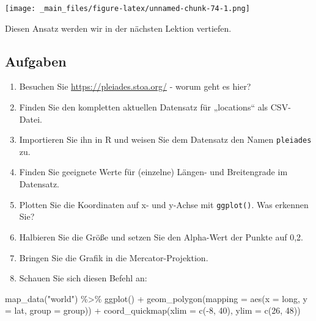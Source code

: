 \documentclass[
  ngerman,
]{article}
\newenvironment{Shaded}{\begin{snugshade}}{\end{snugshade}}
\newcommand{\AttributeTok}[1]{\textcolor[rgb]{0.77,0.63,0.00}{#1}}
\newcommand{\DecValTok}[1]{\textcolor[rgb]{0.00,0.00,0.81}{#1}}
\newcommand{\FunctionTok}[1]{\textcolor[rgb]{0.00,0.00,0.00}{#1}}
\newcommand{\NormalTok}[1]{#1}
\newcommand{\SpecialCharTok}[1]{\textcolor[rgb]{0.00,0.00,0.00}{#1}}
\newcommand{\StringTok}[1]{\textcolor[rgb]{0.31,0.60,0.02}{#1}}
\begin{document}
\texttt{[image: \_main\_files/figure-latex/unnamed-chunk-74-1.png]}

Diesen Ansatz werden wir in der nächsten Lektion vertiefen.

\hypertarget{aufgaben-3}{%
\subsection{Aufgaben}\label{aufgaben-3}}

\begin{enumerate}
\def\labelenumi{\arabic{enumi}.}
\item
  Besuchen Sie \url{https://pleiades.stoa.org/} - worum geht es hier?
\item
  Finden Sie den kompletten aktuellen Datensatz für „locations`` als CSV-Datei.
\item
  Importieren Sie ihn in R und weisen Sie dem Datensatz den Namen \texttt{pleiades} zu.
\item
  Finden Sie geeignete Werte für (einzelne) Längen- und Breitengrade im Datensatz.
\item
  Plotten Sie die Koordinaten auf x- und y-Achse mit \texttt{ggplot()}. Was erkennen Sie?
\item
  Halbieren Sie die Größe und setzen Sie den Alpha-Wert der Punkte auf 0,2.
\item
  Bringen Sie die Grafik in die Mercator-Projektion.
\item
  Schauen Sie sich diesen Befehl an:
\end{enumerate}

\begin{Shaded}
\begin{Highlighting}[]
\FunctionTok{map\_data}\NormalTok{(}\StringTok{"world"}\NormalTok{) }\SpecialCharTok{\%\textgreater{}\%}
  \FunctionTok{ggplot}\NormalTok{() }\SpecialCharTok{+}
    \FunctionTok{geom\_polygon}\NormalTok{(}\AttributeTok{mapping =} \FunctionTok{aes}\NormalTok{(}\AttributeTok{x =}\NormalTok{ long,}
                               \AttributeTok{y =}\NormalTok{ lat,}
                               \AttributeTok{group =}\NormalTok{ group)) }\SpecialCharTok{+}
    \FunctionTok{coord\_quickmap}\NormalTok{(}\AttributeTok{xlim =} \FunctionTok{c}\NormalTok{(}\SpecialCharTok{{-}}\DecValTok{8}\NormalTok{, }\DecValTok{40}\NormalTok{),}
                   \AttributeTok{ylim =} \FunctionTok{c}\NormalTok{(}\DecValTok{26}\NormalTok{, }\DecValTok{48}\NormalTok{))}
\end{Highlighting}
\end{Shaded}
\end{document}
